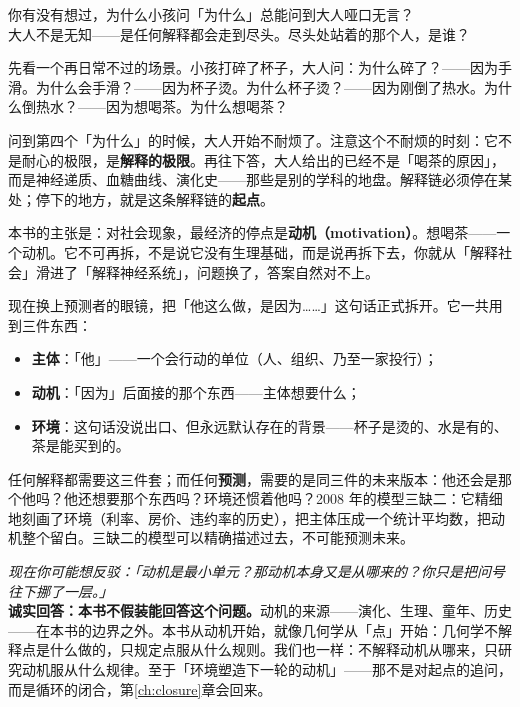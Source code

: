 \documentclass[../../main2.tex]{subfiles}
\begin{document}
	\begin{readingnote}
		你有没有想过，为什么小孩问「为什么」总能问到大人哑口无言？\\
		大人不是无知——是任何解释都会走到尽头。尽头处站着的那个人，是谁？
	\end{readingnote}

	先看一个再日常不过的场景。小孩打碎了杯子，大人问：为什么碎了？——因为手滑。为什么会手滑？——因为杯子烫。为什么杯子烫？——因为刚倒了热水。为什么倒热水？——因为想喝茶。为什么想喝茶？

	问到第四个「为什么」的时候，大人开始不耐烦了。注意这个不耐烦的时刻：它不是耐心的极限，是\textbf{解释的极限}。再往下答，大人给出的已经不是「喝茶的原因」，而是神经递质、血糖曲线、演化史——那些是别的学科的地盘。解释链必须停在某处；停下的地方，就是这条解释链的\textbf{起点}。

	本书的主张是：对社会现象，最经济的停点是\textbf{动机（motivation）}。想喝茶——一个动机。它不可再拆，不是说它没有生理基础，而是说再拆下去，你就从「解释社会」滑进了「解释神经系统」，问题换了，答案自然对不上。

	现在换上预测者的眼镜，把「他这么做，是因为……」这句话正式拆开。它一共用到三件东西：
	\begin{itemize}
		\item \textbf{主体}：「他」——一个会行动的单位（人、组织、乃至一家投行）；
		\item \textbf{动机}：「因为」后面接的那个东西——主体想要什么；
		\item \textbf{环境}：这句话没说出口、但永远默认存在的背景——杯子是烫的、水是有的、茶是能买到的。
	\end{itemize}

	任何解释都需要这三件套；而任何\textbf{预测}，需要的是同三件的未来版本：他还会是那个他吗？他还想要那个东西吗？环境还惯着他吗？2008 年的模型三缺二：它精细地刻画了环境（利率、房价、违约率的历史），把主体压成一个统计平均数，把动机整个留白。三缺二的模型可以精确描述过去，不可能预测未来。

	\begin{questionbox}
		\textit{现在你可能想反驳：「动机是最小单元？那动机本身又是从哪来的？你只是把问号往下挪了一层。」}\\
		\textbf{诚实回答：本书不假装能回答这个问题。}动机的来源——演化、生理、童年、历史——在本书的边界之外。本书从动机开始，就像几何学从「点」开始：几何学不解释点是什么做的，只规定点服从什么规则。我们也一样：不解释动机从哪来，只研究动机服从什么规律。至于「环境塑造下一轮的动机」——那不是对起点的追问，而是循环的闭合，第\ref{ch:closure}章会回来。
	\end{questionbox}
\end{document}
